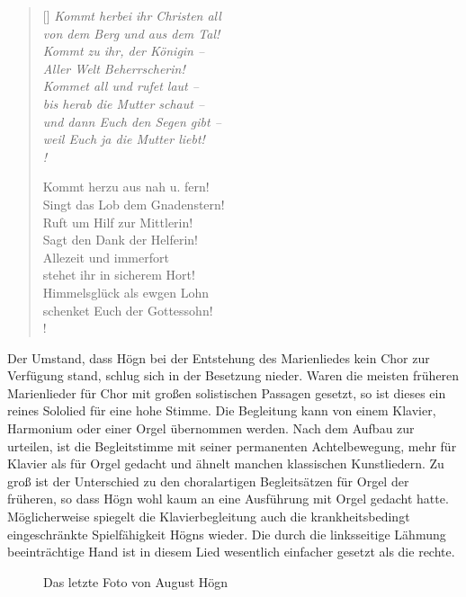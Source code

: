 \settowidth{\versewidth}{Singt das Lob dem Gnadenstern!}

\begin{verse}[\versewidth]
\itshape
Kommt herbei ihr Christen all \\
von dem Berg und aus dem Tal! \\
Kommt zu ihr, der Königin – \\
Aller Welt Beherrscherin!\\
Kommet all und rufet laut – \\
bis herab die Mutter schaut – \\
und dann Euch den Segen gibt – \\
weil Euch ja die Mutter liebt! \\!

Kommt herzu aus nah u. fern! \\
Singt das Lob dem Gnadenstern! \\
Ruft um Hilf zur Mittlerin! \\
Sagt den Dank der Helferin! \\
Allezeit und immerfort \\
stehet ihr in sicherem Hort! \\
Himmelsglück als ewgen Lohn \\
schenket Euch der Gottessohn! \\!
\end{verse}

Der Umstand, dass Högn bei der Entstehung des Marienliedes kein Chor zur
Verfügung stand, schlug sich in der Besetzung nieder. Waren die meisten
früheren Marienlieder für Chor mit großen solistischen Passagen
gesetzt, so ist dieses ein reines Sololied für eine hohe Stimme. Die
Begleitung kann von einem Klavier, Harmonium oder einer Orgel
übernommen werden. Nach dem Aufbau zur urteilen, ist die Begleitstimme
mit seiner permanenten Achtelbewegung, mehr für Klavier als für Orgel
gedacht und ähnelt manchen klassischen Kunstliedern. Zu groß ist der
Unterschied zu den choralartigen Begleitsätzen für Orgel der
früheren, so dass Högn wohl kaum an eine Ausführung mit Orgel gedacht
hatte. Möglicherweise spiegelt die Klavierbegleitung auch die
krankheitsbedingt eingeschränkte Spielfähigkeit Högns wieder. Die durch
die linksseitige Lähmung beeinträchtige Hand ist in diesem Lied
wesentlich einfacher gesetzt als die rechte.

\begin{figure}
\centering
{}
\caption{Das letzte Foto von August Högn}
\end{figure}

